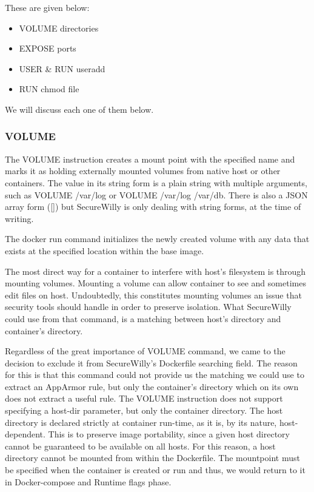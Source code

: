 These  are given below:
\begin{itemize}
\item VOLUME directories
\item EXPOSE ports
\item USER \& RUN useradd
\item RUN chmod file
\end{itemize}

We will discuss each one of them below.

\subsubsection{VOLUME}

The VOLUME instruction creates a mount point with the specified name and marks it as holding externally mounted volumes from native host or other containers. The value in its string form is a plain string with multiple arguments, such as VOLUME /var/log or VOLUME /var/log /var/db. There is also a JSON array form ([]) but SecureWilly is only dealing with string forms, at the time of writing.

The docker run command initializes the newly created volume with any data that exists at the specified location within the base image.

The most direct way for a container to interfere with host's filesystem is through mounting volumes. Mounting a volume can allow container to see and sometimes edit files on host. Undoubtedly, this constitutes mounting volumes an issue that security tools should handle in order to preserve isolation. What SecureWilly could use from that command, is a matching between host's directory and container's directory. 

Regardless of the great importance of VOLUME command, we came to the decision to exclude it from SecureWilly's Dockerfile searching field. The reason for this is that this command could not provide us the matching we could use to extract an AppArmor rule, but only the container's directory which on its own does not extract a useful rule. The VOLUME instruction does not support specifying a host-dir parameter, but only the container directory. The host directory is declared strictly at container run-time, as it is, by its nature, host-dependent. This is to preserve image portability, since a given host directory cannot be guaranteed to be available on all hosts. For this reason, a host directory cannot be mounted from within the Dockerfile.  The mountpoint must be specified when the container is created or run and thus, we would return to it in Docker-compose and Runtime flags phase.


